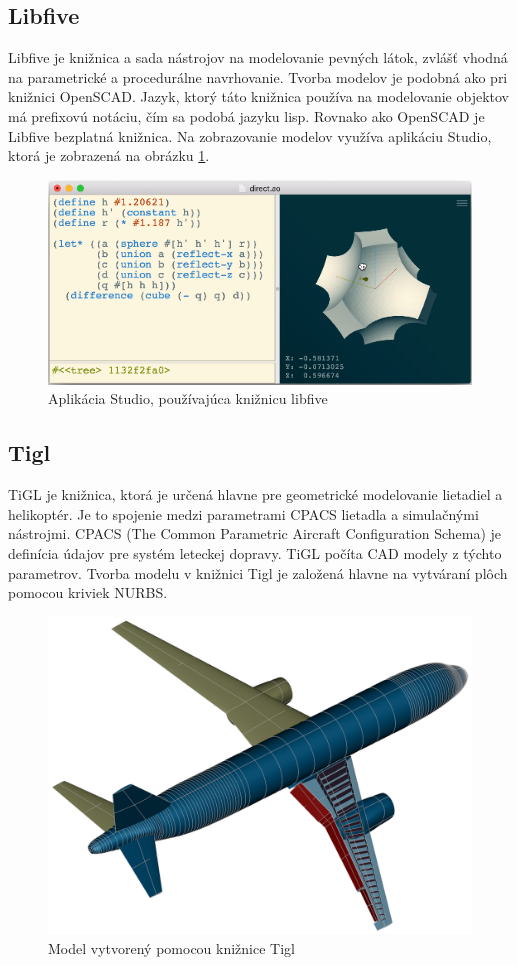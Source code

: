 \subsection*{Libfive}
Libfive je knižnica  a sada nástrojov na modelovanie pevných látok, zvlášť vhodná na parametrické a procedurálne navrhovanie. Tvorba modelov je podobná ako pri knižnici OpenSCAD. Jazyk, ktorý táto knižnica používa na modelovanie objektov má prefixovú notáciu, čím sa podobá jazyku lisp. Rovnako ako OpenSCAD je Libfive bezplatná  knižnica. Na zobrazovanie modelov využíva aplikáciu Studio, ktorá je zobrazená na obrázku \ref{fig:LibfiveStudio}. \cite{}\nopagebreak
\begin{figure}[H]
    \centering
    \includegraphics[width = 0.9\linewidth]{obrazky-figures/programs/libfive.png}
    \caption{Aplikácia Studio, používajúca knižnicu libfive \cite{} }
    \label{fig:LibfiveStudio}
\end{figure}


\subsection*{Tigl}
TiGL je knižnica, ktorá je určená hlavne pre geometrické modelovanie lietadiel a helikoptér. 
Je to spojenie medzi parametrami CPACS lietadla a simulačnými nástrojmi. 
CPACS (The Common Parametric Aircraft Configuration Schema) je definícia údajov pre systém leteckej dopravy. TiGL počíta CAD modely z týchto parametrov.
Tvorba modelu v knižnici Tigl je založená hlavne na vytváraní plôch pomocou kriviek NURBS. \cite{}\nopagebreak
\begin{figure}[H]
    \centering
    \includegraphics[width = 0.5\linewidth]{obrazky-figures/programs/tigl.png}
    \caption{Model vytvorený pomocou knižnice Tigl \cite{} }
    \label{fig:Tigl}
\end{figure}

